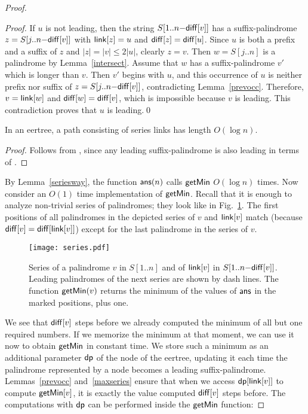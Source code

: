 \documentclass{llncs}
\def\link{{\sf link}}
\def\ans{{\sf ans}}
\def\diff{{\sf diff}}
\def\getmin{{\sf getMin}}
\def\ddp{{\sf dp}}
\begin{document}
\begin{proof}
\begin{proof}
If $u$ is not leading, then the string $S[1..n{-}\diff[v]]$ has a suffix-palindrome $z=S[j..n{-}\diff[v]]$ with $\link[z]=u$ and $\diff[z]=\diff[u]$. Since $u$ is both a prefix and a suffix of $z$ and $|z|=|v|\le 2|u|$, clearly $z=v$. Then $w=S[j..n]$ is a palindrome by Lemma~\ref{intersect}. Assume that $w$ has a suffix-palindrome $v'$ which is longer than $v$. Then $v'$ begins with $u$, and this occurrence of $u$ is neither prefix nor suffix of $z=S[j..n{-}\diff[v]]$, contradicting Lemma~\ref{prevocc}. Therefore, $v=\link[w]$ and $\diff[w]=\diff[v]$, which is impossible because $v$ is leading. This contradiction proves that $u$ is leading.\qed
\end{proof}

\begin{lemma} \label{seriesway}
In an eertree, a path consisting of series links has length $O(\log n)$.
\end{lemma}

\begin{proof}
Follows from \cite[Lemma 6]{KRS15}, since any leading suffix-palindrome is also leading in terms of \cite{KRS15}. 
\end{proof}

By Lemma~\ref{seriesway}, the function $\ans(n)$ calls $\getmin$ $O(\log n)$ times. Now consider an $O(1)$ time implementation of $\getmin$. Recall that it is enough to analyze non-trivial series of palindromes; they look like in Fig.~\ref{fig:series}. The first positions of all palindromes in the depicted series of $v$ and $\link[v]$ match (because $\diff[v]=\diff[\link[v]]$) except for the last palindrome in the series of $v$.

\begin{figure}[hbt!]
\vspace*{-4mm}
\centering
\texttt{[image: series.pdf]}
\vspace*{-2mm}
\caption{Series of a palindrome $v$ in $S[1..n]$ and of $\link[v]$ in $S[1..n{-}\diff[v]]$. Leading palindromes of the next series are shown by dash lines. The function $\getmin(v)$ returns the minimum of the values of $\ans$ in the marked positions, plus one.}
\label{fig:series}
\end{figure}
\vspace*{-3mm}

We see that $\diff[v]$ steps before we already computed the minimum of all but one required numbers. If we memorize the minimum at that moment, we can use it now to obtain $\getmin$ in constant time. We store such a minimum as an additional parameter $\ddp$ of the node of the eertree, updating it each time the palindrome represented by a node becomes a leading suffix-palindrome. Lemmas~\ref{prevocc} and~\ref{maxseries} ensure that when we access $\ddp[\link[v]]$ to compute $\getmin[v]$, it is exactly the value computed $\diff[v]$ steps before. The computations with $\ddp$ can be performed inside the $\getmin$ function:


\end{proof}
\end{document}

